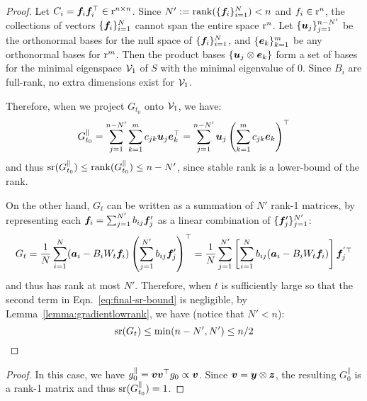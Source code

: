 \lowrankmid*
\begin{proof}
Let $C_i = {\bm{f}}_i{\bm{f}}_i^\top \in {\textnormal{r}}^{n\times n}$. Since $N' := \mathrm{rank}(\{{\bm{f}}_i\}_{i=1}^N) < n$ and $f_i \in {\textnormal{r}}^n$, the collections of vectors $\{{\bm{f}}_i\}_{i=1}^N$ cannot span the entire space ${\textnormal{r}}^n$. Let $\{{\bm{u}}_j\}_{j=1}^{n-N'}$ be the orthonormal bases for the null space of $\{{\bm{f}}_i\}_{i=1}^N$, and $\{{\bm{e}}_k\}_{k=1}^m$ be any orthonormal bases for ${\textnormal{r}}^m$. Then the product bases $\{{\bm{u}}_j\otimes {\bm{e}}_k\}$ form a set of bases for the minimal eigenspace $\mathcal{V}_1$ of $S$ with the minimal eigenvalue of $0$. Since $B_i$ are full-rank, no extra dimensions exist for $\mathcal{V}_1$.

Therefore, when we project $G_{t_0}$ onto $\mathcal{V}_1$, we have:
\begin{equation}
    G_{t_0}^\parallel = \sum_{j=1}^{n-N'}\sum_{k=1}^m c_{jk} {\bm{u}}_j {\bm{e}}^\top_k = \sum_{j=1}^{n-N'} 
 {\bm{u}}_j \left(\sum_{k=1}^m c_{jk} {\bm{e}}_k\right)^\top 
\end{equation}
and thus $\mathrm{sr}(G_{t_0}^\parallel) \le \mathrm{rank}(G_{t_0}^\parallel) \le n - N'$,  
since stable rank is a lower-bound of the rank. 

On the other hand, $G_t$ can be written as a summation of $N'$ rank-1 matrices, by representing each ${\bm{f}}_i = \sum_{j=1}^{N'} b_{ij} {\bm{f}}'_j$ as a linear combination of $\{{\bm{f}}'_j\}_{j=1}^{N'}$:  
\begin{equation}
    G_t = \frac1N \sum_{i=1}^N ({\bm{a}}_i - B_i W_t {\bm{f}}_i)\left(\sum_{j=1}^{N'} b_{ij} {\bm{f}}'_j\right)^\top = \frac1N \sum_{j=1}^{N'} \left[\sum_{i=1}^N b_{ij} ({\bm{a}}_i - B_i W_t {\bm{f}}_i)\right] {\bm{f}}^{'\top}_j 
\end{equation}
and thus has rank at most $N'$. Therefore, when $t$ is sufficiently large so that the second term in Eqn.~\ref{eq:final-sr-bound} is negligible, by Lemma~\ref{lemma:gradientlowrank}, we have (notice that $N' < n$):
\begin{equation}
    \mathrm{sr}(G_t) \le \min(n - N', N') \le n / 2
\end{equation}
\end{proof}

\lowrankhigh*
\begin{proof}
In this case, we have $g^\parallel_0 = {\bm{v}}{\bm{v}}^\top g_0 \propto {\bm{v}}$. Since ${\bm{v}} = {\bm{y}} \otimes {\bm{z}}$, the resulting $G^\parallel_0$ is a rank-1 matrix and thus $\mathrm{sr}(G_{t_0}^\parallel) = 1$.
\end{proof}

